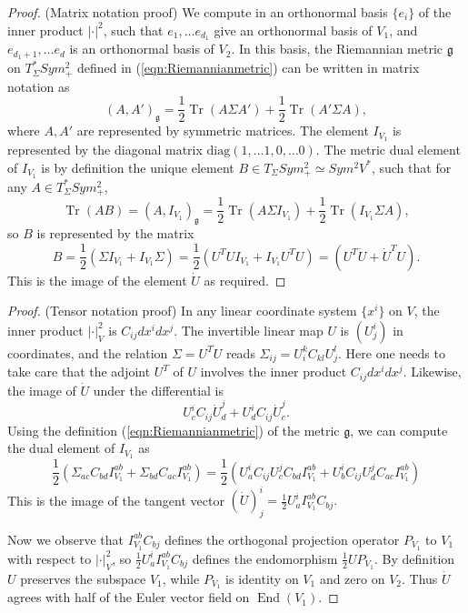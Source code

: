 \documentclass[a4paper]{article}
\theoremstyle{definition}
\newcommand{\1}{\mathbbm{1}}
\DeclareMathOperator{\End}{End}
\DeclareMathOperator{\Tr}{Tr}
\begin{document}
	
	
	
	
	
	\begin{proof}
		(Matrix notation proof)
		We compute in an orthonormal basis $\{e_i\}$ of the inner product $|\cdot|^2$, such that $e_1,\ldots e_{d_1}$ give an orthonormal basis of $V_1$, and $e_{d_1+1},\ldots e_d$ is an orthonormal basis of $V_2$. In this basis, the Riemannian metric $\mathfrak{g}$ on $T_\Sigma^* Sym^2_+$ defined in (\ref{eqn:Riemannianmetric}) can be written in matrix notation as 
		\[
		(A,A')_{\mathfrak{g}} = \frac{1}{2}\Tr (A\Sigma A')+ \frac{1}{2}\Tr (A'\Sigma A) ,
		\]
		where $A, A'$ are represented by symmetric matrices. 
		The element $I_{V_1}$ is represented by the diagonal matrix $\text{diag}(1,\ldots 1, 0,\ldots 0)$. The metric dual element of $I_{V_1}$ is by definition the unique element $B\in T_\Sigma Sym^2_+\simeq Sym^2 V^*$, such that for any $A\in T_\Sigma^* Sym^2_+$,
		\[
		\Tr (AB)= (A, I_{V_1})_{\mathfrak{g}}= \frac{1}{2} \Tr (A\Sigma I_{V_1}) + \frac{1}{2}  \Tr (I_{V_1}\Sigma A),
		\]
		so $B$ is represented by the matrix
		\[
		B= \frac{1}{2} (\Sigma I_{V_1}+ I_{V_1}\Sigma) = \frac{1}{2} (U^T U I_{V_1}+ I_{V_1} U^T U)=   (U^T \dot{U} + \dot{U}^T U).
		\]
		This is the image of the element $\dot{U}$ as required.
	\end{proof}
	
	
	
	
	
	
	
	
	
	
	\begin{proof}
		(Tensor notation proof) In any linear coordinate system $\{x^i\}$ on $V$, 
		the inner product $|\cdot|_V^2$ is $C_{ij}dx^idx^j$. The invertible linear map $U$ is $(U^i_j)$ in coordinates, and the relation $\Sigma=U^T U$ reads
		$
		\Sigma_{ij}= U_i^k C_{kl} U_j^l.
		$
		Here one needs to take care that the adjoint $U^T$ of $U$ involves the inner product $C_{ij}dx^idx^j$. Likewise, the image of $\dot{U}$ under the differential is
		\[
		U^i_c C_{ij} \dot{U}^j_d +  U^i_d C_{ij} \dot{U}^j_c.
		\]
		Using the definition (\ref{eqn:Riemannianmetric}) of the metric $\mathfrak{g}$, we can compute the dual element of $I_{V_1}$ as
		\[
		\frac{1}{2} (\Sigma_{ac} C_{bd} I_{V_1}^{ ab } + \Sigma_{bd} C_{ac} I_{V_1}^{ab})= \frac{1}{2} (U_a^i C_{ij} U_c^j C_{bd} I_{V_1}^{ ab } + U_b^i C_{ij} U_d^j C_{ac} I_{V_1}^{ab}) 
		\]
		This is the image of the tangent vector
		$
		(\dot{U})^i_j=  \frac{1}{2} U^i_a I_{V_1}^{ab} C_{bj}.
		$
		
		
		
		
		Now we observe that $I_{V_1}^{ab} C_{bj}$ defines the orthogonal projection operator $P_{V_1}$ to $V_1$ with respect to $|\cdot|_V^2$, so $\frac{1}{2} U^i_a I_{V_1}^{ab} C_{bj}$ defines the endomorphism $\frac{1}{2} U P_{V_1}$. By definition $U$ preserves the subspace $V_1$, while $P_{V_1}$ is identity on $V_1$ and zero on $V_2$. Thus $\dot{U}$ agrees with half of the Euler vector field on $\End(V_1)$. 
	\end{proof}
	
\end{document}
